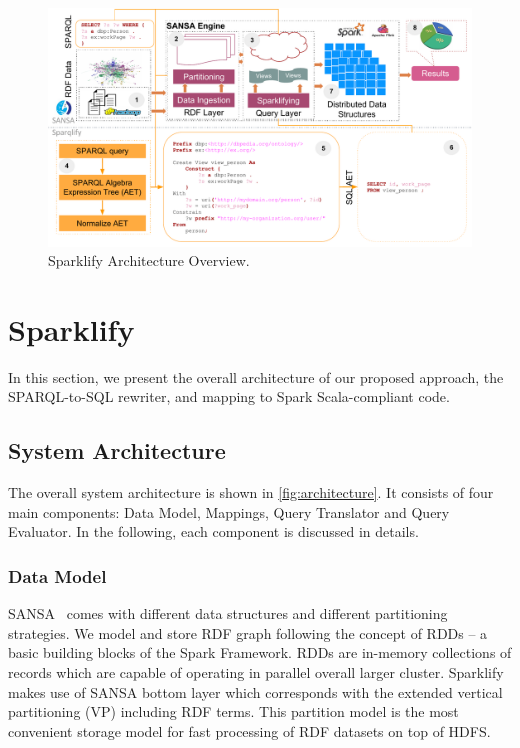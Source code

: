 \begin{figure}[t]
\centering
\includegraphics[width=1.0\textwidth]{images/sparklify-architecture.pdf}
\caption{Sparklify Architecture Overview.}
\label{fig:architecture}
\end{figure}

\section{Sparklify}
\label{sec:approach}

In this section, we present the overall architecture of our proposed approach, the SPARQL-to-SQL rewriter, and mapping to Spark Scala-compliant code.

\subsection{System Architecture}
The overall system architecture is shown in \autoref{fig:architecture}.
It consists of four main components: Data Model, Mappings, Query Translator and Query Evaluator.
In the following, each component is discussed in details.

\subsubsection{Data Model}
SANSA~\cite{lehmann-2017-sansa-iswc} comes with different data structures and different partitioning strategies.
We model and store RDF graph following the concept of RDDs -- a basic building blocks of the Spark Framework.
RDDs are in-memory collections of records which are capable of operating in parallel overall larger cluster.
Sparklify makes use of SANSA bottom layer which corresponds with the extended vertical partitioning (VP) including RDF terms.
This partition model is the most convenient storage model for fast processing of RDF datasets on top of HDFS.
